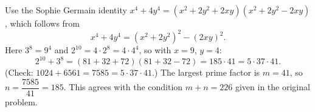 Use the Sophie Germain identity $x^4+4y^4=(x^2+2y^2+2xy)(x^2+2y^2-2xy)$, which follows from
\[
x^4+4y^4=(x^2+2y^2)^2-(2xy)^2 .
\]
Here $3^8=9^4$ and $2^{10}=4\cdot2^8=4\cdot4^4$, so with $x=9$, $y=4$:
\[
2^{10}+3^8=(81+32+72)(81+32-72)=185\cdot41=5\cdot37\cdot41 .
\]
(Check: $1024+6561=7585=5\cdot37\cdot41$.) The largest prime factor is $m=41$, so $n=\dfrac{7585}{41}=\boxed{185}$. This agrees with the condition $m+n=226$ given in the original problem.
